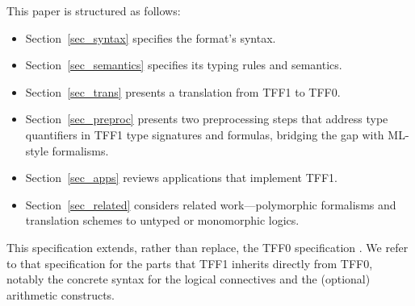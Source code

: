 This paper is structured as follows:
\begin{itemize}
\item Section~\ref{sec_syntax} specifies the format's syntax.
\item Section~\ref{sec_semantics} specifies its typing rules and semantics.
\item Section~\ref{sec_trans} presents a translation from TFF1 to TFF0.
\item Section~\ref{sec_preproc} presents two preprocessing steps that address type quantifiers
in TFF1 type signatures and formulas, bridging the gap with ML-style
formalisms. %
\item Section~\ref{sec_apps} reviews applications that implement TFF1.
\item Section~\ref{sec_related} considers related work---polymorphic formalisms and translation
schemes to untyped or monomorphic logics.
\end{itemize}

This specification extends, rather than replace, the TFF0 specification
\cite{sutcliffe-et-al-2011-tff0}. We refer to that specification for the parts
that TFF1 inherits directly from TFF0, notably the
concrete syntax for the logical connectives and the
(optional) arithmetic constructs.
